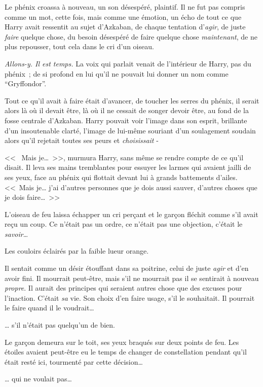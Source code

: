 Le phénix croassa à nouveau, un son désespéré, plaintif. Il ne fut pas compris comme un mot, cette fois, mais comme une émotion, un écho de tout ce que Harry avait ressentit au sujet d'Azkaban, de chaque tentation d'\emph{agir}, de juste \emph{faire} quelque chose, du besoin désespéré de faire quelque chose \emph{maintenant}, de ne plus repousser, tout cela dans le cri d'un oiseau.

\emph{Allons-y. Il est temps.} La voix qui parlait venait de l'intérieur de Harry, pas du phénix~; de si profond en lui qu'il ne pouvait lui donner un nom comme “Gryffondor”.

Tout ce qu'il avait à faire était d'avancer, de toucher les serres du phénix, il serait alors là où il devait être, là où il ne cessait de songer devoir être, au fond de la fosse centrale d'Azkaban. Harry pouvait voir l'image dans son esprit, brillante d'un insoutenable clarté, l'image de lui-même souriant d'un soulagement soudain alors qu'il rejetait toutes ses peurs et \emph{choisissait} -

<<~ Mais je…~>>, murmura Harry, sans même se rendre compte de ce qu'il disait. Il leva ses mains tremblantes pour essuyer les larmes qui avaient jailli de ses yeux, face au phénix qui flottait devant lui à grands battements d'ailes. <<~Mais je… j'ai d'autres personnes que je dois aussi sauver, d'autres choses que je dois faire…~>>

L'oiseau de feu laissa échapper un cri perçant et le garçon fléchit comme s'il avait reçu un coup. Ce n'était pas un ordre, ce n'était pas une objection, c'était le \emph{savoir}…

Les couloirs éclairés par la faible lueur orange.

Il sentait comme un désir étouffant dans sa poitrine, celui de juste \emph{agir} et d'en avoir fini. Il mourrait peut-être, mais s'il ne mourrait pas il se sentirait à nouveau \emph{propre}. Il aurait des principes qui seraient autres chose que des excuses pour l'inaction. C'était \emph{sa} vie. Son choix d'en faire usage, s'il le souhaitait. Il pourrait le faire quand il le voudrait…

… s'il n'était pas quelqu'un de bien.

\later

Le garçon demeura sur le toit, ses yeux braqués sur deux points de feu. Les étoiles avaient peut-être eu le temps de changer de constellation pendant qu'il était resté ici, tourmenté par cette décision…

… qui ne voulait pas…

